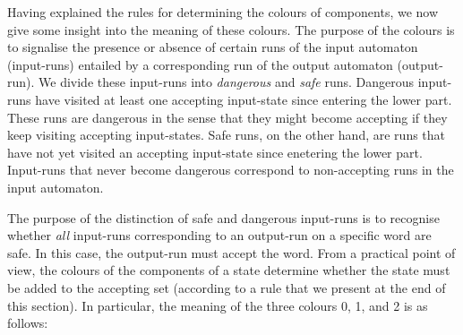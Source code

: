 
Having explained the rules for determining the colours of components, we now give some insight into the meaning of these colours. The purpose of the colours is to signalise the presence or absence of certain runs of the input automaton (input-runs) entailed by a corresponding run of the output automaton (output-run). We divide these input-runs into \textit{dangerous} and \textit{safe} runs. Dangerous input-runs have visited at least one accepting input-state since entering the lower part. These runs are dangerous in the sense that they might become accepting if they keep visiting accepting input-states. Safe runs, on the other hand, are runs that have not yet visited an accepting input-state since enetering the lower part. Input-runs that never become dangerous correspond to non-accepting runs in the input automaton.

The purpose of the distinction of safe and dangerous input-runs is to recognise whether \textit{all} input-runs corresponding to an output-run on a specific word are safe. In this case, the output-run must accept the word. From a practical point of view, the colours of the components of a state determine whether the state must be added to the accepting set (according to a rule that we present at the end of this section). In particular, the meaning of the three colours 0, 1, and 2 is as follows:


